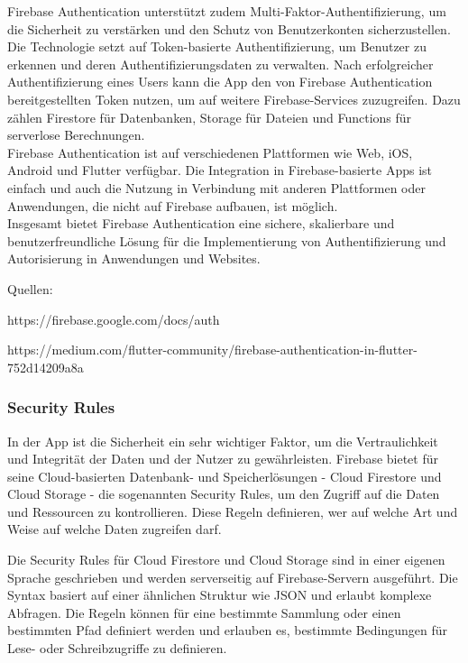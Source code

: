 Firebase Authentication unterstützt zudem Multi-Faktor-Authentifizierung, um die Sicherheit zu verstärken und den Schutz von Benutzerkonten sicherzustellen.
\\
Die Technologie setzt auf Token-basierte Authentifizierung, um Benutzer zu erkennen und deren Authentifizierungsdaten zu verwalten. Nach erfolgreicher Authentifizierung eines Users kann die App den von Firebase Authentication bereitgestellten Token nutzen, um auf weitere Firebase-Services zuzugreifen. Dazu zählen Firestore für Datenbanken, Storage für Dateien und Functions für serverlose Berechnungen.
\\
Firebase Authentication ist auf verschiedenen Plattformen wie Web, iOS, Android und Flutter verfügbar. Die Integration in Firebase-basierte Apps ist einfach und auch die Nutzung in Verbindung mit anderen Plattformen oder Anwendungen, die nicht auf Firebase aufbauen, ist möglich.
\\
Insgesamt bietet Firebase Authentication eine sichere, skalierbare und benutzerfreundliche Lösung für die Implementierung von Authentifizierung und Autorisierung in Anwendungen und Websites.

Quellen:

https://firebase.google.com/docs/auth

https://medium.com/flutter-community/firebase-authentication-in-flutter-752d14209a8a

\subsubsection{Security Rules}\label{sec:security-rules}
In der App ist die Sicherheit ein sehr wichtiger Faktor,
um die Vertraulichkeit und Integrität der Daten und der
Nutzer zu gewährleisten. Firebase bietet für seine
Cloud-basierten Datenbank- und Speicherlösungen - Cloud
Firestore und Cloud Storage - die sogenannten Security
Rules\cite{firebase-rules-docs}\cite{firestore-rules-firestore-nochba}\cite{storage-rules-storage-nochba}, um den Zugriff auf
die Daten und Ressourcen zu kontrollieren. Diese Regeln
definieren, wer auf welche Art und Weise auf welche Daten
zugreifen darf.

Die Security Rules für Cloud Firestore und Cloud Storage sind in einer eigenen Sprache geschrieben und werden serverseitig auf Firebase-Servern ausgeführt. Die Syntax basiert auf einer ähnlichen Struktur wie JSON und erlaubt komplexe Abfragen. Die Regeln können für eine bestimmte Sammlung oder einen bestimmten Pfad definiert werden und erlauben es, bestimmte Bedingungen für Lese- oder Schreibzugriffe zu definieren.


